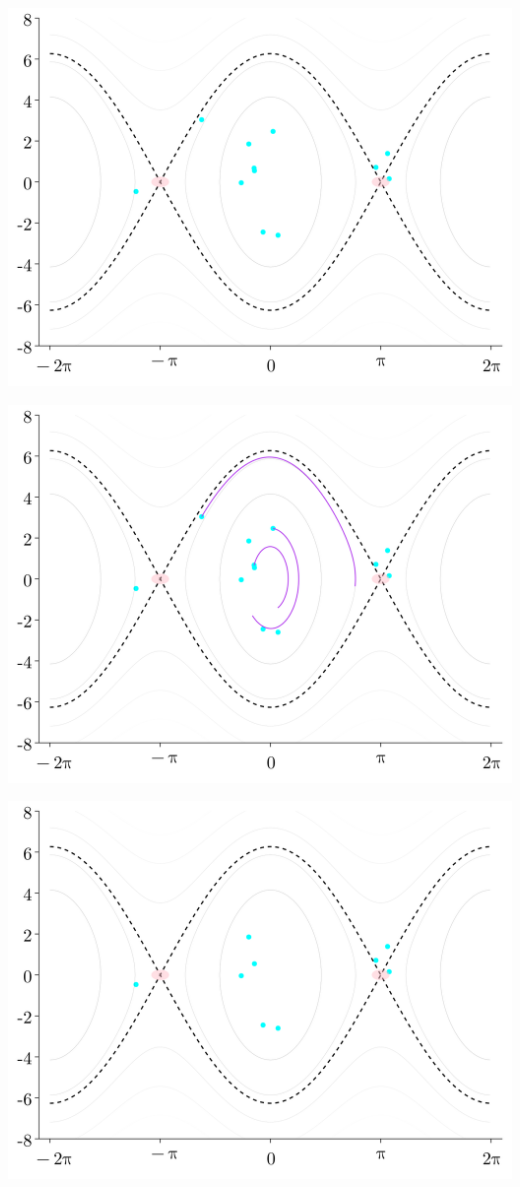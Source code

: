 \documentclass[
]{report}
\begin{document}
\includegraphics{contents/assets/neuralpbc/025.svg}

\includegraphics{contents/assets/neuralpbc/026.svg}

\includegraphics{contents/assets/neuralpbc/027.svg}
\end{document}
